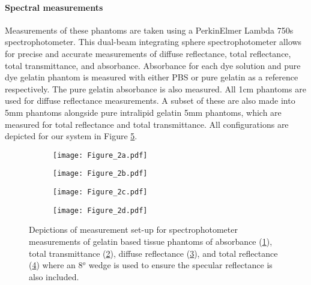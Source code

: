 \paragraph{Spectral measurements}\label{sec:methodsphantommeasure1}
Measurements of these phantoms are taken using a PerkinElmer Lambda 750s spectrophotometer. This dual-beam integrating sphere spectrophotometer allows for precise and accurate measurements of diffuse reflectance, total reflectance, total transmittance, and absorbance. Absorbance for each dye solution and pure dye gelatin phantom is measured with either PBS or pure gelatin as a reference respectively. The pure gelatin absorbance is also measured. 
All 1cm phantoms are used for diffuse reflectance measurements. A subset of these are also made into 5mm phantoms alongside pure intralipid gelatin 5mm phantoms, which are measured for total reflectance and total transmittance. 
All configurations are depicted for our system in Figure \ref{fig:spectrophotometer}. 
\begin{figure}[t!]
    \centering
    \begin{subfigure}{0.49\textwidth}
        \texttt{[image: Figure\_2a.pdf]}
        \caption{}
        \label{fig:spectrophotometer_abs}
    \end{subfigure}
    \begin{subfigure}{0.49\textwidth}
        \texttt{[image: Figure\_2b.pdf]}
        \caption{}
        \label{fig:spectrophotometer_dT}
    \end{subfigure}
    \hfill
    \begin{subfigure}{0.49\textwidth}
        \texttt{[image: Figure\_2c.pdf]}
        \caption{}
        \label{fig:spectrophotometer_dR}
    \end{subfigure}
    \begin{subfigure}{0.49\textwidth}
        \texttt{[image: Figure\_2d.pdf]}
        \caption{}
        \label{fig:spectrophotometer_tR}
    \end{subfigure}
    \caption{Depictions of measurement set-up for spectrophotometer measurements of gelatin based tissue phantoms of absorbance (\ref{fig:spectrophotometer_abs}), total transmittance (\ref{fig:spectrophotometer_dT}), diffuse reflectance (\ref{fig:spectrophotometer_dR}), and total reflectance (\ref{fig:spectrophotometer_tR}) where an 8$^o$ wedge is used to ensure the specular reflectance is also included.}
    \label{fig:spectrophotometer}
\end{figure}

